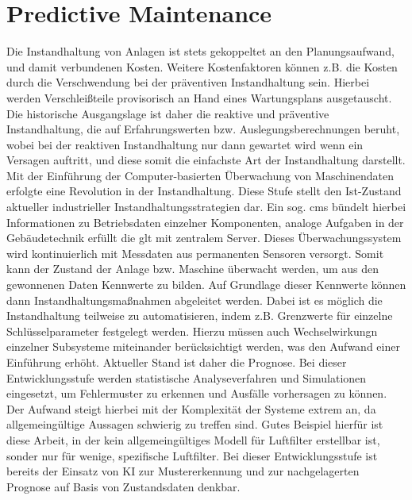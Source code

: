     \section{Predictive Maintenance}
    \label{sec:predmain}
    Die Instandhaltung von Anlagen ist stets gekoppeltet an den Planungsaufwand, und damit verbundenen Kosten. Weitere Kostenfaktoren können z.B. die Kosten durch die Verschwendung bei der präventiven Instandhaltung sein. Hierbei werden Verschleißteile provisorisch an Hand eines Wartungsplans ausgetauscht.
    Die historische Ausgangslage ist daher die reaktive und präventive Instandhaltung, die auf Erfahrungswerten bzw. Auslegungsberechnungen beruht, wobei bei der reaktiven Instandhaltung nur dann gewartet wird wenn ein Versagen auftritt, und diese somit die einfachste Art der Instandhaltung darstellt. Mit der Einführung der Computer-basierten Überwachung von Maschinendaten erfolgte eine Revolution in der Instandhaltung. Diese Stufe stellt den Ist-Zustand aktueller industrieller Instandhaltungsstrategien dar. Ein sog. \ac{cms} bündelt hierbei Informationen zu Betriebsdaten einzelner Komponenten, analoge Aufgaben in der Gebäudetechnik erfüllt die \ac{glt} mit zentralem Server. Dieses Überwachungssystem wird kontinuierlich mit Messdaten aus permanenten Sensoren versorgt. Somit kann der Zustand der Anlage bzw. Maschine überwacht werden, um aus den gewonnenen Daten Kennwerte zu bilden. Auf Grundlage dieser Kennwerte können dann Instandhaltungsmaßnahmen abgeleitet werden. Dabei ist es möglich die Instandhaltung teilweise zu automatisieren, indem z.B. Grenzwerte für einzelne  Schlüsselparameter festgelegt werden. Hierzu müssen auch Wechselwirkungn einzelner Subsysteme miteinander berücksichtigt werden, was den Aufwand einer Einführung erhöht. Aktueller Stand ist daher die Prognose. Bei dieser Entwicklungsstufe werden statistische Analyseverfahren und Simulationen eingesetzt, um Fehlermuster zu erkennen und Ausfälle vorhersagen zu können. \cite{inst} 
    Der Aufwand steigt hierbei mit der Komplexität der Systeme extrem an, da allgemeingültige Aussagen schwierig zu treffen sind. Gutes Beispiel hierfür ist diese Arbeit, in der kein allgemeingültiges Modell für Luftfilter erstellbar ist, sonder nur für wenige, spezifische Luftfilter. 
    Bei dieser Entwicklungsstufe ist bereits der Einsatz von KI zur Mustererkennung und zur nachgelagerten Prognose auf Basis von Zustandsdaten denkbar.
